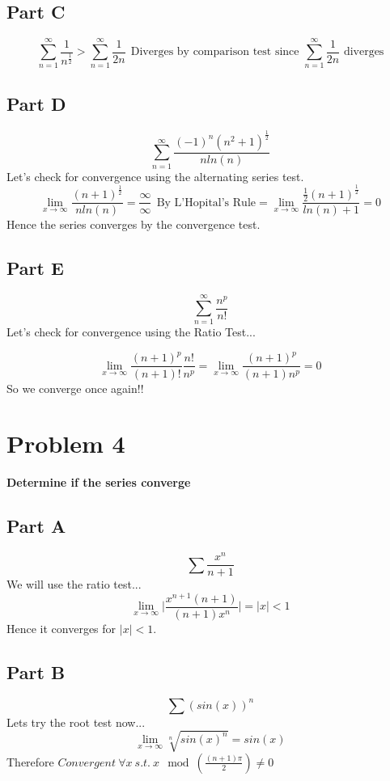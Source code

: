 \documentclass[10pt,a4paper]{article}
\begin{document}
	\subsection{Part C}
	\begin{equation}
	\nonumber
	\sum_{n=1}^\infty \frac{1}{n^\frac{1}{2}} > \sum_{n=1}^\infty \frac{1}{2n} \ \ \text{Diverges by comparison test since $\sum_{n=1}^\infty \frac{1}{2n}$ diverges}
	\end{equation}
	
	\subsection{Part D}
	\begin{equation}
	\nonumber
	\sum_{n=1}^\infty \frac{(-1)^n(n^2+1)^\frac{1}{2}}{nln(n)} 
	\end{equation}
	Let's check for convergence using the alternating series test.
	$$\lim_{x\to\infty} \frac{(n+1)^\frac{1}{2}}{nln(n)} = \frac{\infty}{\infty} \ \ \text{By L'Hopital's Rule} = \lim_{x\to\infty}\frac{\frac{1}{2}(n+1)^\frac{1}{2}}{ln(n)+1} = 0$$
	Hence the series converges by the convergence test.
	
	\subsection{Part E}
	\begin{equation}
	\nonumber
	\sum_{n=1}^\infty \frac{n^p}{n!}
	\end{equation}
	Let's check for convergence using the Ratio Test...
	
	$$\lim_{x\to\infty}\frac{(n+1)^p}{(n+1)!}\frac{n!}{n^p} = \lim_{x\to\infty}\frac{(n+1)^p}{(n+1)n^p} = 0$$
	So we converge once again!!
	
	\newpage
	\section{Problem 4}
	\textbf{Determine if the series converge}
	\subsection{Part A}
	$$\sum \frac{x^n}{n+1} $$
	We will use the ratio test...
	$$\lim_{x\to\infty}\Big|\frac{x^{n+1}(n+1)}{(n+1)x^n}\Big| = |x|<1 $$
	Hence it converges for $|x|<1$.
	
	\subsection{Part B}
	$$\sum (sin(x))^n $$
	Lets try the root test now...
	$$\lim_{x\to\infty} \sqrt[n]{sin(x)^n} = sin(x) $$
	Therefore $Convergent \ \forall x \ s.t. \ x\mod(\frac{(n+1)\pi}{2})\neq 0$
	
\end{document}
